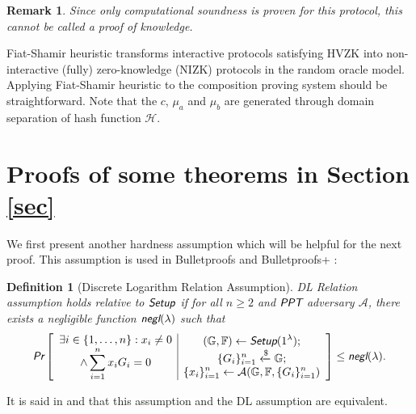 \documentclass{article}
\newtheorem{definition}{Definition}[section]
\newtheorem*{remark}{Remark}
\begin{document}
\begin{remark}
{\normalfont
Since only computational soundness is proven for this protocol, this cannot be called a proof of knowledge.}
\end{remark}

Fiat-Shamir heuristic transforms interactive protocols satisfying HVZK into non-interactive (fully) zero-knowledge (NIZK) protocols in the random oracle model. Applying Fiat-Shamir heuristic to the composition proving system should be straightforward. Note that the $c$, $\mu_a$ and $\mu_b$ are generated through domain separation of hash function $\mathcal{H}$.

\section{Proofs of some theorems in Section \ref{sec}}\label{proofs}
We first present another hardness assumption which will be helpful for the next proof. This assumption is used in Bulletproofs \cite{bp} and Bulletproofs+ \cite{bp-plus}:

\begin{definition}[Discrete Logarithm Relation Assumption]
DL Relation assumption holds relative to $\emph{\textsf{Setup}}$ if for all $n \ge 2$ and  $\emph{\textsf{PPT}}$ adversary $\mathcal{A}$, there exists a negligible function $\emph{\textsf{negl}}(\lambda)$ such that
\begin{align*}
\emph{\textsf{Pr}}\left[
\begin{array}{c|c}
	\begin{gathered}
		\exists i \in \{1, \ldots, n\}: x_i \ne 0 \\
		\wedge \sum_{i=1}^{n} x_i G_i = 0
	\end{gathered}
	&
	\begin{gathered}
		(\mathbb{G}, \mathbb{F})\leftarrow\emph{\textsf{Setup}}(1^{\lambda}); \\
		\{G_i\}_{i=1}^n \xleftarrow{\$}\mathbb{G}; \\
		\{x_i\}_{i=1}^n \leftarrow\mathcal{A}(\mathbb{G}, \mathbb{F}, \{G_i\}_{i=1}^n) \\
	\end{gathered}
\end{array}
\right]
\le \emph{\textsf{negl}}(\lambda).
\end{align*}
\end{definition}
It is said in \cite{bp} and \cite{bp-plus} that this assumption and the DL assumption are equivalent.
\end{document}
